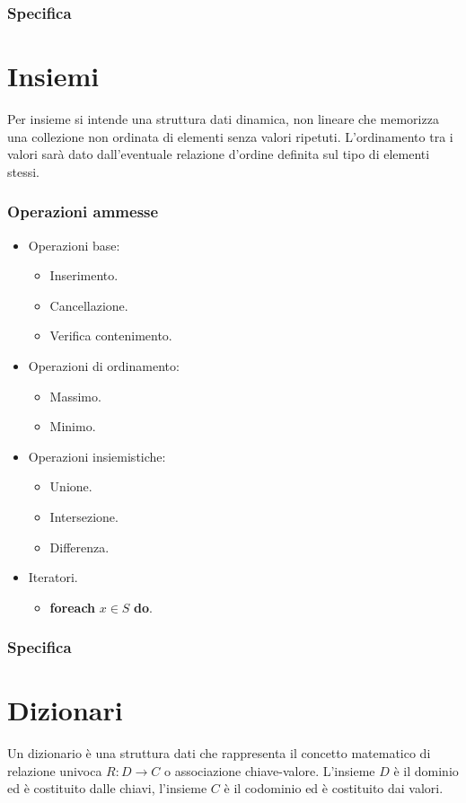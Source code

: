 \subsubsection{Specifica}

\newpage
\section{Insiemi}
Per insieme si intende una struttura dati dinamica, non lineare che memorizza una collezione non ordinata di elementi senza valori ripetuti. L'ordinamento
tra i valori sar\`a dato dall'eventuale relazione d'ordine definita sul tipo di elementi stessi. 
\subsubsection{Operazioni ammesse}
\begin{multicols}{2}
\begin{itemize}
\item Operazioni base:
\begin{itemize}
\item Inserimento.
\item Cancellazione.
\item Verifica contenimento.
\end{itemize}
\item Operazioni di ordinamento:
\begin{itemize}
\item Massimo.
\item Minimo.
\end{itemize}
\item Operazioni insiemistiche:
\begin{itemize}
\item Unione.
\item Intersezione.
\item Differenza.
\end{itemize}
\item Iteratori.
\begin{itemize}
\item \textbf{foreach} $x\in S$ \textbf{do}.
\end{itemize}
\end{itemize}
\end{multicols}
\subsubsection{Specifica}

\section{Dizionari}
Un dizionario \`e una struttura dati che rappresenta il concetto matematico di relazione univoca $R:D\rightarrow C$ o associazione chiave-valore. L'insieme
$D$ \`e il dominio ed \`e costituito dalle chiavi, l'insieme $C$ \`e il codominio ed \`e costituito dai valori.
